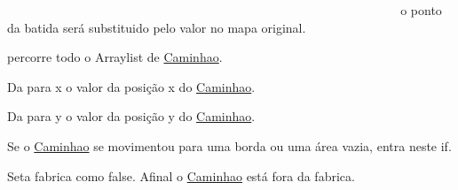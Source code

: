 ~\newline
~\newline
~\newline
~\newline
~\newline
~\newline
~\newline
~\newline
~\newline
~\newline
~\newline
~\newline
~\newline
~\newline
~\newline
~\newline
~\newline
~\newline
~\newline
~\newline
~\newline
~\newline
~\newline
~\newline
~\newline
~\newline
~\newline
~\newline
~\newline
~\newline
~\newline
~\newline
~\newline
~\newline
~\newline
~\newline
~\newline
~\newline
 o ponto da batida será substituido pelo valor no mapa original.

percorre todo o Arraylist de \mbox{\hyperlink{class_caminhao}{Caminhao}}.

Da para x o valor da posição x do \mbox{\hyperlink{class_caminhao}{Caminhao}}.

Da para y o valor da posição y do \mbox{\hyperlink{class_caminhao}{Caminhao}}.

Se o \mbox{\hyperlink{class_caminhao}{Caminhao}} se movimentou para uma borda ou uma área vazia, entra neste if.

Seta fabrica como false. Afinal o \mbox{\hyperlink{class_caminhao}{Caminhao}} está fora da fabrica.

